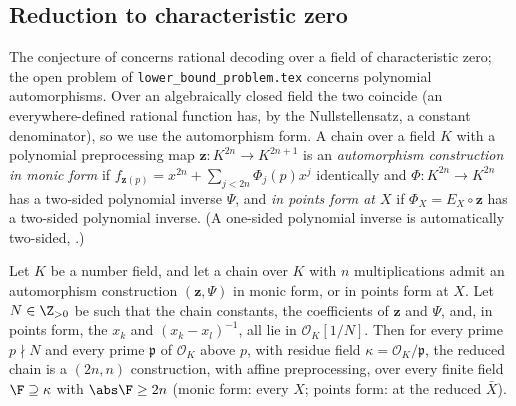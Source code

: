 \subsection{Reduction to characteristic zero}
\label{sec:charp-reduction}

The conjecture of  concerns rational decoding over a field of
characteristic zero; the open problem of \texttt{lower\_bound\_problem.tex} concerns
polynomial automorphisms.  Over an algebraically closed field the two coincide (an
everywhere-defined rational function has, by the Nullstellensatz, a constant denominator),
so we use the automorphism form.  A chain over a field $K$ with a polynomial preprocessing
map $\mathbf z\colon K^{2n}\to K^{2n+1}$ is an \emph{automorphism construction in monic
form} if $f_{\mathbf z(p)}=x^{2n}+\sum_{j<2n}\Phi_j(p)x^j$ identically and
$\Phi\colon K^{2n}\to K^{2n}$ has a two-sided polynomial inverse $\Psi$, and \emph{in
points form at $X$} if $\Phi_X=E_X\circ\mathbf z$ has a two-sided polynomial inverse.
(A one-sided polynomial inverse is automatically two-sided,
.)

\begin{proposition}
\label{prop:charp-reduction}
Let $K$ be a number field, and let a chain over $K$ with $n$ multiplications admit an
automorphism construction $(\mathbf z,\Psi)$ in monic form, or in points form at $X$.
Let $N\in\Z_{>0}$ be such that the chain constants, the coefficients of $\mathbf z$ and
$\Psi$, and, in points form, the $x_k$ and $(x_k-x_l)^{-1}$, all lie in
$\mathcal O_K[1/N]$.  Then for every prime $p\nmid N$ and every prime $\mathfrak p$ of
$\mathcal O_K$ above $p$, with residue field $\kappa=\mathcal O_K/\mathfrak p$, the
reduced chain is a $(2n,n)$ construction, with affine preprocessing, over every finite
field $\F\supseteq\kappa$ with $\abs\F\ge2n$ (monic form: every $X$; points form: at the
reduced $\bar X$).
\end{proposition}

